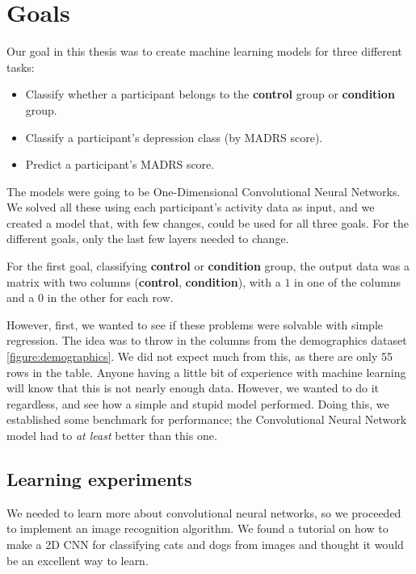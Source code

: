 \section{Goals}

Our goal in this thesis was to create machine learning models for three different tasks:

\begin{itemize}
  \item Classify whether a participant belongs to the \textbf{control} group or \textbf{condition} group.
  \item Classify a participant's depression class (by MADRS score).
  \item Predict a participant's MADRS score.
\end{itemize}

The models were going to be One-Dimensional Convolutional Neural Networks. We solved all these using each participant's activity data as input, and we created a model that, with few changes, could be used for all three goals. For the different goals, only the last few layers needed to change. 

For the first goal, classifying \textbf{control} or \textbf{condition} group, the output data was a matrix with two columns (\textbf{control}, \textbf{condition}), with a $1$ in one of the columns and a $0$ in the other for each row. 

However, first, we wanted to see if these problems were solvable with simple regression. The idea was to throw in the columns from the demographics dataset \ref{figure:demographics}. We did not expect much from this, as there are only 55 rows in the table. Anyone having a little bit of experience with machine learning will know that this is not nearly enough data. However, we wanted to do it regardless, and see how a simple and stupid model performed. Doing this, we established some benchmark for performance; the Convolutional Neural Network model had to \textit{at least} better than this one.

\subsection{Learning experiments}

We needed to learn more about convolutional neural networks, so we proceeded to implement an image recognition algorithm. We found a tutorial on how to make a 2D CNN for classifying cats and dogs from images \cite{2d_cnn} and thought it would be an excellent way to learn.

